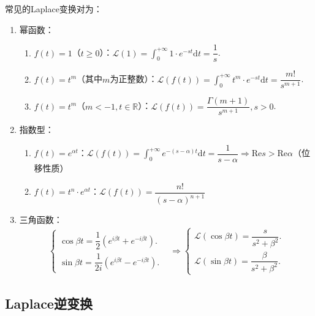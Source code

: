 \documentclass[openany,oneside]{ctexbook}
\begin{document}
常见的Laplace变换对为：
\begin{enumerate}[label=(\arabic*), itemsep=1pt]
    \item 幂函数：
        \begin{enumerate}
            \item $f(t)=1$（$t\geq0$）：$\mathcal{L}(1)=\displaystyle\int_0^{+\infty}1\cdot e^{-st}\mathrm{d}t=\dfrac{1}{s}$.
            \item $f(t)=t^m$（其中$m$为正整数）：$\mathcal{L}(f(t))=\displaystyle\int_0^{+\infty}t^m\cdot e^{-st}\mathrm{d}t=\dfrac{m!}{s^{m+1}}$.
            \item $f(t)=t^m$（$m<-1, t\in \mathbb{R}$）：$\mathcal{L}(f(t))=\dfrac{\Gamma(m+1)}{s^{m+1}}, s>0$.
        \end{enumerate}
    \item 指数型：
        \begin{enumerate}
            \item $f(t)=e^{\alpha t}$：$\mathcal{L}(f(t))=\displaystyle\int_0^{+\infty}e^{-(s-\alpha)t}\mathrm{d}t=\dfrac{1}{s-\alpha}\Rightarrow \mathrm{Re} s>\mathrm{Re}\alpha$（位移性质）
            \item $f(t)=t^n\cdot e^{\alpha t}$：$\mathcal{L}(f(t))=\dfrac{n!}{(s-\alpha)^{n+1}}$
        \end{enumerate}
    \item 三角函数：
        \begin{align*}
            \begin{cases}
                \cos\beta t=\dfrac{1}{2}(e^{i\beta t}+e^{-i\beta t}).\\
                \sin\beta t=\dfrac{1}{2i}(e^{i\beta t}-e^{-i\beta t}).
            \end{cases}
            & \Rightarrow
            \begin{cases}
                \mathcal{L}(\cos\beta t)=\dfrac{s}{s^2+\beta^2}.\\
                \mathcal{L}(\sin\beta t)=\dfrac{\beta}{s^2+\beta^2}.
            \end{cases}
        \end{align*}
\end{enumerate}

\subsection{Laplace逆变换}
\end{document}
